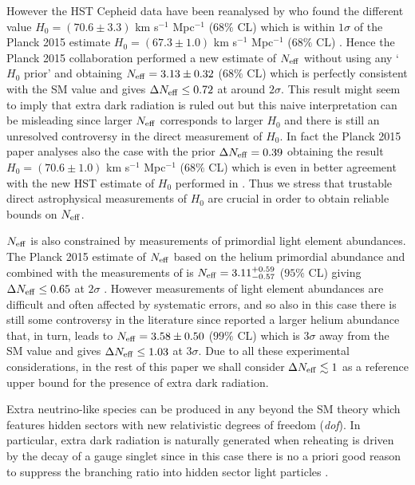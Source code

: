 \documentclass[11pt,a4paper]{article}
\begin{document}
However the HST Cepheid data have been reanalysed by \cite{Efstathiou:2013via} who found the different value $H_0 = (70.6\pm 3.3)$ km s$^{-1}$ Mpc$^{-1}$ ($68\%$ CL) which is within $1\sigma$ of the Planck 2015 estimate $H_0 = (67.3\pm 1.0)$ km s$^{-1}$ Mpc$^{-1}$ ($68\%$ CL) \cite{Planck:2015xua}. Hence the Planck 2015 collaboration performed a new estimate of $N_{\rm eff}$ without using any `$H_0$ prior' and obtaining $N_{\rm eff} = 3.13 \pm 0.32$ ($68\%$ CL) \cite{Planck:2015xua} which is perfectly consistent with the SM value and gives $\Delta N_{\rm eff} \leq 0.72$ at around $2\sigma$. This result might seem to imply that extra dark radiation is ruled out but this naive interpretation can be misleading since larger $N_{\rm eff}$ corresponds to larger $H_0$ and there is still an unresolved controversy in the direct measurement of $H_0$. In fact the Planck 2015 paper \cite{Planck:2015xua} analyses also the case with the prior $\Delta N_{\rm eff}=0.39$ obtaining the result $H_0 = (70.6\pm 1.0)$ km s$^{-1}$ Mpc$^{-1}$ ($68\%$ CL) which is even in better agreement with the new HST estimate of $H_0$ performed in \cite{Efstathiou:2013via}. Thus we stress that trustable direct astrophysical measurements of $H_0$ are crucial in order to obtain reliable bounds on $N_{\rm eff}$. 

$N_{\rm eff}$ is also constrained by measurements of primordial light element abundances. The Planck 2015 estimate of $N_{\rm eff}$ based on the helium primordial abundance and combined with the measurements of \cite{Aver:2013wba} is $N_{\rm eff}= 3.11^{+0.59}_{-0.57}$ ($95\%$ CL) giving $\Delta N_{\rm eff} \leq 0.65$ at $2\sigma$ \cite{Planck:2015xua}. However measurements of light element abundances are difficult and often affected by systematic errors, and so also in this case there is still some controversy in the literature since \cite{Izotov:2014fga} reported a larger helium abundance that, in turn, leads to $N_{\rm eff}= 3.58 \pm 0.50$ ($99\%$ CL) which is $3\sigma$ away from the SM value and gives $\Delta N_{\rm eff} \leq 1.03$ at $3\sigma$. Due to all these experimental considerations, in the rest of this paper we shall consider $\Delta N_{\rm eff}\lesssim 1$ as a reference upper bound for the presence of extra dark radiation.

Extra neutrino-like species can be produced in any beyond the SM theory which features hidden sectors with new relativistic degrees of freedom (\textit{dof}). In particular, extra dark radiation is naturally generated when reheating is driven by the decay of a gauge singlet since in this case there is no a priori good reason to suppress the branching ratio into hidden sector light particles \cite{DR1, DR2, AxionProbl}. 
\end{document}
